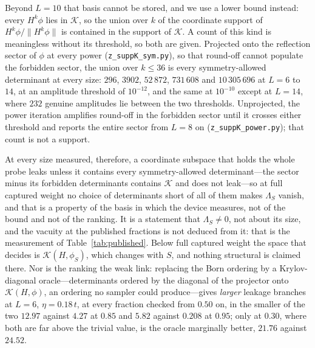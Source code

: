 Beyond $L=10$ that basis cannot be stored, and we use a lower bound instead: every $H^{k}\phi$ lies in
$\mathcal K$, so the union over $k$ of the coordinate support of $H^{k}\phi/\lVert H^{k}\phi\rVert$ is
contained in the support of $\mathcal K$. A count of this kind is meaningless without its threshold,
so both are given. Projected onto the reflection sector of $\phi$ at every power (\texttt{z\_suppK\_sym.py}), so that round-off cannot populate the forbidden sector, the union over $k\le36$ is every symmetry-allowed determinant at every size: $296$, $3902$, $52\,872$, $731\,608$ and $10\,305\,696$ at $L=6$ to $14$, at an amplitude threshold of $10^{-12}$, and the same at $10^{-10}$ except at $L=14$, where $232$ genuine amplitudes lie between the two thresholds. Unprojected, the power iteration amplifies round-off in the forbidden sector until it crosses either threshold and reports the entire sector from $L=8$ on (\texttt{z\_suppK\_power.py}); that count is not a support.

At every size measured, therefore, a coordinate subspace that holds the whole probe leaks unless it contains every symmetry-allowed determinant---the sector minus its forbidden determinants contains $\mathcal K$ and does not leak---so at full captured weight no choice of determinants short of all of them makes $\Lambda_S$ vanish, and that is a property of the basis in which the device measures, not of the bound and not of the ranking. It is a statement that $\Lambda_S\neq0$, not about its size, and the vacuity at the published fractions is not deduced from it: that is the measurement of Table~\ref{tab:published}. Below full captured weight the space that decides is $\mathcal K(H,\phi_S)$, which changes with $S$, and nothing structural is claimed there. Nor is the ranking the weak link: replacing the Born ordering by a Krylov-diagonal oracle---determinants ordered by the diagonal of the projector onto $\mathcal K(H,\phi)$, an ordering no sampler could produce---gives \emph{larger} leakage branches at $L=6$, $\eta=0.18\,t$, at every fraction checked from $0.50$ on, in the smaller of the two $12.97$ against $4.27$ at $0.85$ and $5.82$ against $0.208$ at $0.95$; only at $0.30$, where both are far above the trivial value, is the oracle marginally better, $21.76$ against $24.52$.

